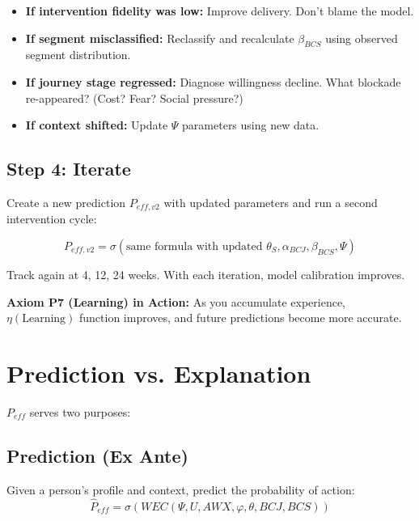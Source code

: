 \begin{itemize}[nosep]

\item \textbf{If intervention fidelity was low:} Improve delivery. Don't blame the model.

\item \textbf{If segment misclassified:} Reclassify and recalculate $\beta_{BCS}$ using observed segment distribution.

\item \textbf{If journey stage regressed:} Diagnose willingness decline. What blockade re-appeared? (Cost? Fear? Social pressure?)

\item \textbf{If context shifted:} Update $\Psi$ parameters using new data.

\end{itemize}

\subsection{Step 4: Iterate}

Create a new prediction $P_{eff,v2}$ with updated parameters and run a second intervention cycle:

\begin{equation}
P_{eff,v2} = \sigma(\text{same formula with updated } \theta_S, \alpha_{BCJ}, \beta_{BCS}, \Psi)
\end{equation}

Track again at 4, 12, 24 weeks. With each iteration, model calibration improves.

\textbf{Axiom P7 (Learning) in Action:} As you accumulate experience, $\eta(\text{Learning})$ function improves, and future predictions become more accurate.

\section{Prediction vs. Explanation}

$P_{eff}$ serves two purposes:

\subsection{Prediction (Ex Ante)}

Given a person's profile and context, predict the probability of action:
\begin{equation}
\hat{P}_{eff} = \sigma(WEC(\Psi, U, AWX, \varphi, \theta, BCJ, BCS))
\end{equation}

